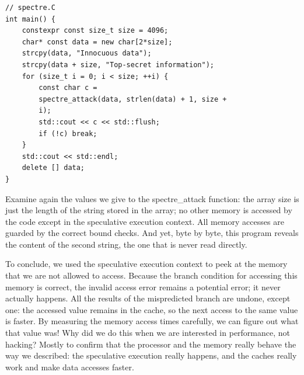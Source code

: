 \begin{lstlisting}[style=styleCXX]
// spectre.C
int main() {
	constexpr const size_t size = 4096;
	char* const data = new char[2*size];
	strcpy(data, "Innocuous data");
	strcpy(data + size, "Top-secret information");
	for (size_t i = 0; i < size; ++i) {
		const char c =
		spectre_attack(data, strlen(data) + 1, size +
		i);
		std::cout << c << std::flush;
		if (!c) break;
	}
	std::cout << std::endl;
	delete [] data;
}
\end{lstlisting}

Examine again the values we give to the spectre\_attack function: the array size is just the length of the string stored in the array; no other memory is accessed by the code except in the speculative execution context. All memory accesses are guarded by the correct bound checks. And yet, byte by byte, this program reveals the content of the second string, the one that is never read directly.

To conclude, we used the speculative execution context to peek at the memory that we are not allowed to access. Because the branch condition for accessing this memory is correct, the invalid access error remains a potential error; it never actually happens. All the results of the mispredicted branch are undone, except one: the accessed value remains in the cache, so the next access to the same value is faster. By measuring the memory access times carefully, we can figure out what that value was! Why did we do this when we are interested in performance, not hacking? Mostly to confirm that the processor and the memory really behave the way we described: the speculative execution really happens, and the caches really work and make data accesses faster.



















